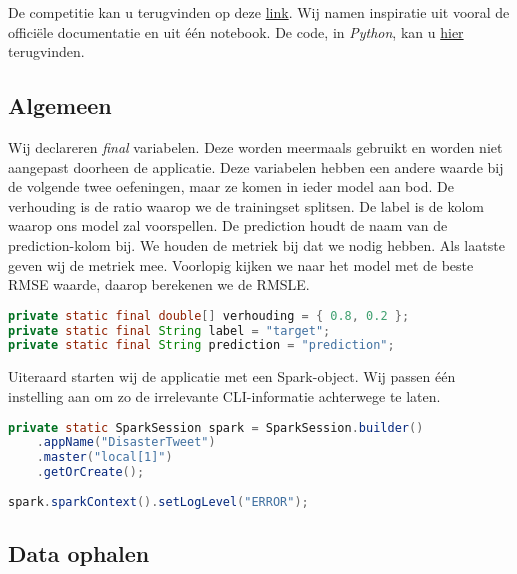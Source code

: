 \documentclass[a4paper,10pt,twoside]{report}
\begin{document}
De competitie kan u terugvinden op deze \href{http://bit.ly/3umBKN5}{link}. Wij namen inspiratie uit vooral de officiële documentatie en uit één notebook. De code, in \textit{Python}, kan u \href{http://bit.ly/3F2Aofj}{hier} terugvinden.

\subsection*{Algemeen}
Wij declareren \textit{final} variabelen. Deze worden meermaals gebruikt en worden niet aangepast doorheen de applicatie. Deze variabelen hebben een andere waarde bij de volgende twee oefeningen, maar ze komen in ieder model aan bod. De verhouding is de ratio waarop we de trainingset splitsen. De label is de kolom waarop ons model zal voorspellen. De prediction houdt de naam van de prediction-kolom bij. We houden de metriek bij dat we nodig hebben. Als laatste geven wij de metriek mee. Voorlopig kijken we naar het model met de beste RMSE waarde, daarop berekenen we de RMSLE.

\begin{lstlisting}[language=Java]
private static final double[] verhouding = { 0.8, 0.2 };
private static final String label = "target";
private static final String prediction = "prediction";
\end{lstlisting}

Uiteraard starten wij de applicatie met een Spark-object. Wij passen één instelling aan om zo de irrelevante CLI-informatie achterwege te laten.

\begin{lstlisting}[language=Java]
private static SparkSession spark = SparkSession.builder()
	.appName("DisasterTweet")
	.master("local[1]")
	.getOrCreate();
	
spark.sparkContext().setLogLevel("ERROR");
\end{lstlisting}

\newpage

\subsection*{Data ophalen}
\end{document}
